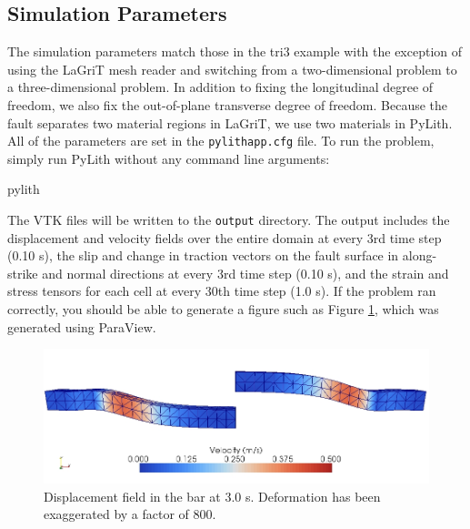 \subsection{Simulation Parameters}

The simulation parameters match those in the tri3 example with the
exception of using the LaGriT mesh reader and switching from a two-dimensional
problem to a three-dimensional problem. In addition to fixing the
longitudinal degree of freedom, we also fix the out-of-plane transverse
degree of freedom. Because the fault separates two material regions
in LaGriT, we use two materials in PyLith. All of the parameters are
set in the \texttt{pylithapp.cfg} file. To run the problem, simply
run PyLith without any command line arguments:
\begin{lyxcode}
pylith
\end{lyxcode}
The VTK files will be written to the \texttt{output} directory. The
output includes the displacement and velocity fields over the entire
domain at every 3rd time step (0.10 s), the slip and change in traction
vectors on the fault surface in along-strike and normal directions
at every 3rd time step (0.10 s), and the strain and stress tensors
for each cell at every 30th time step (1.0 s). If the problem ran
correctly, you should be able to generate a figure such as Figure
\ref{fig:shearwave:tet4:deform}, which was generated using ParaView.

\noindent \begin{center}
\begin{figure}
\begin{centering}
\includegraphics[scale=0.5]{tutorials/shearwave/figs/tet4deform30}
\par\end{centering}

\caption{Displacement field in the bar at 3.0 s. Deformation has been exaggerated
by a factor of 800.\label{fig:shearwave:tet4:deform}}
\end{figure}

\par\end{center}
